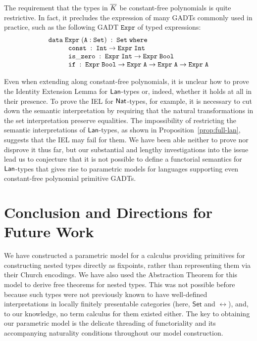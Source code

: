 \documentclass{lmcs}
\theoremstyle{plain}\newtheorem{satz}[thm]{Satz}
\newcommand{\set}{\mathsf{Set}}
\begin{document}
{The requirement that the types in $\overline{K}$ be constant-free
polynomials is quite restrictive. In fact, it precludes the expression
of many GADTs commonly used in practice, such as the following GADT
$\mathtt{Expr}$ of typed expressions:
\[
\begin{array}{l}
\mathtt{data\; Expr \;(A : Set)\;:\;Set\;where}\\
\hspace*{0.4in}\mathtt{const\;:\; Int \to Expr\; Int}\\
\hspace*{0.4in}\mathtt{is\_zero\;:\; Expr\; Int \rightarrow Expr\; Bool}\\
\hspace*{0.4in}\mathtt{if\;:\; Expr\; Bool \to Expr\; A \to Expr\; A \to Expr\; A}
\end{array}
\]

Even when extending along constant-free polynomials, it is unclear how
to prove the Identity Extension Lemma for $\mathsf{Lan}$-types or, indeed,
whether it holds at all in their presence. To prove the IEL for
$\mathsf{Nat}$-types, for example, it is necessary to cut down the semantic
interpretation by requiring that the natural transformations in the
set interpretation preserve equalities. The impossibility of
restricting the semantic interpretations of $\mathsf{Lan}$-types, as shown in
Proposition~\ref{prop:full-lan}, suggests that the IEL may fail for
them. We have been able neither to prove nor disprove it thus far, but
our substantial and lengthy investigations into the issue lead us to
conjecture that it is not possible to define a functorial semantics
for $\mathsf{Lan}$-types that gives rise to parametric models for languages
supporting even constant-free polynomial primitive GADTs.

\section{Conclusion and Directions for Future Work}\label{sec:conclusion}

We have constructed a parametric model for a calculus providing
primitives for constructing nested types directly as fixpoints, rather
than representing them via their Church encodings. We have also used
the Abstraction Theorem for this model to derive free theorems for
nested types. This was not possible before~\cite{jp19} because such
types were not previously known to have well-defined interpretations
in locally finitely presentable categories (here, $\set$ and $\rel$),
and, to our knowledge, no term calculus for them existed either. The
key to obtaining our parametric model is the delicate threading of
functoriality and its accompanying naturality conditions throughout
our model construction.

}
\end{document}
